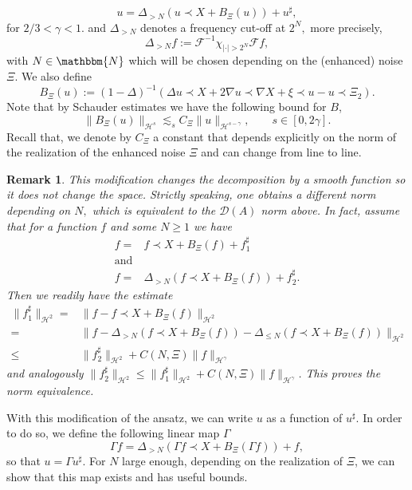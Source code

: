 \documentclass[11pt, oneside]{article}   	%
\newcommand{\assign}{:=}
\newcommand{\cdummy}{\cdot}
\newcommand{\tmop}[1]{\ensuremath{\operatorname{#1}}}
\newtheorem{remark}[theorem]{Remark}
\newcommand{\ssp}{\mathscr{H}}
\begin{document}
\begin{equation}
u = \Delta_{> N} (u \prec X + B_{\Xi} (u)) + u^{\sharp}, \label{eq:ansatz}
\end{equation}
for $2/3<\gamma < 1.$ and  $\Delta_{> N} $ denotes a frequency cut-off at $2^N,$ more precisely,
	\[ \Delta_{> N} f \assign \mathscr{F}^{- 1} \chi_{| \cdummy | > 2^N}
	\mathscr{F}f, \]
with $N \in
\mathbbm{N}$ which will be chosen depending on the (enhanced) noise $\Xi .$ We also
define
\begin{equation}
B_{\Xi} (u) \assign (1 - \Delta)^{- 1} (\Delta u \prec X + 2 \nabla u \prec
\nabla X + \xi \prec u - u \prec \Xi_2) . \label{eq:def-G}
\end{equation}
Note that by Schauder estimates we have the following bound for $B$, 
\[ \| B_{\Xi} (u) \|_{\ssp^s} \lesssim_s C_{\Xi} \| u \|_{\ssp^{s - \gamma}}, \qquad
s \in [0, 2 \gamma] . \]
Recall that, we denote by $C_\Xi$ a constant that depends explicitly on the norm of the realization of the enhanced noise $\Xi$  and can change from line to line.
\begin{remark}\upshape	\upshape \label{rem:equivalentCuttofSp}
	This modification changes the decomposition by a smooth function so it does not change
	the space. Strictly speaking, one obtains a different norm depending on $N,$ which  is equivalent to the
	$\mathscr{D}(A)$ norm above.
	In fact, assume that for a function $f$ and some $N \ge 1$ we have
	\begin{align*}
	f  = & f \prec X + B_{\Xi} (f) + f_1^{\sharp}\\
	\tmop{and} & \\
	f  = & \Delta_{> N} (f \prec X + B_{\Xi} (f)) + f_2^{\sharp} .
	\end{align*}
	Then we readily have the estimate
	\begin{align*}
	\| f^{\sharp}_1 \|_{\ssp^2}  = & \| f - f \prec X + B_{\Xi} (f) \|_{\ssp^2}\\
	= & \| f - \Delta_{> N} (f \prec X + B_{\Xi} (f)) - \Delta_{\le
		N} (f \prec X + B_{\Xi} (f)) \|_{\ssp^2}\\
	\le & \| f_2^{\sharp} \|_{\ssp^2} + C (N, \Xi) \| f \|_{\ssp^{\gamma}}
	\end{align*}
	and analogously $\| f^{\sharp}_2 \|_{\ssp^2} \le \| f_1^{\sharp} \|_{\ssp^2}
	+ C (N, \Xi) \| f \|_{\ssp^{\gamma}}$. This proves the norm equivalence.
\end{remark}


With this modification of the ansatz, we can
write $u$ as a function of $u^{\sharp}$. In order to do so, we define the following linear map $\Gamma$ 
\[ \Gamma f = \Delta_{> N} (\Gamma f \prec X + B_{\Xi} (\Gamma f)) + f, \]
so that $u = \Gamma u^{\sharp}$. For $N$ large enough, depending on the realization of $\Xi$, we can show that this map exists and has useful bounds. 
\end{document}
